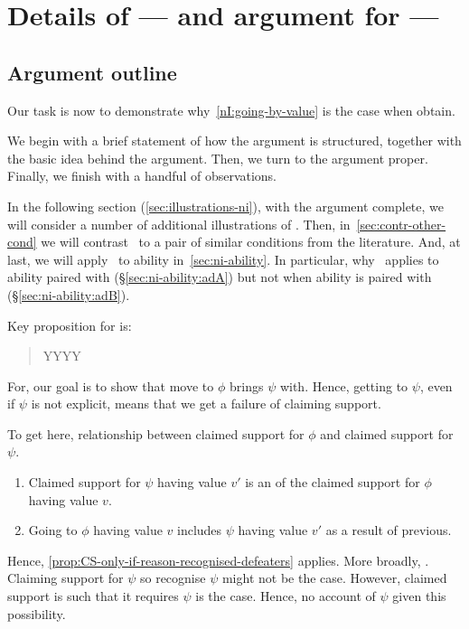 \newpage

\section{Details of --- and argument for --- \nI{}}
\label{sec:details-ni}
\label{sec:re-do-ni}

\subsection*{Argument outline}

\begin{note}
  Our task is now to demonstrate why~\ref{nI:going-by-value} is the case when \nIBackground{} obtain.

  We begin with a brief statement of how the argument is structured, together with the basic idea behind the argument.
  Then, we turn to the argument proper.
  Finally, we finish with a handful of observations.

  In the following section (\ref{sec:illustrations-ni}), with the argument complete, we will consider a number of additional illustrations of \nI{}.
  Then, in~\ref{sec:contr-other-cond} we will contrast~\nI{} to a pair of similar conditions from the literature.
  And, at last, we will apply~\nI{} to ability in~\autoref{sec:ni-ability}.
  In particular, why~\nI{} applies to ability paired with \adA{} (\S\ref{sec:ni-ability:adA}) but not when ability is paired with \adB{} (\S\ref{sec:ni-ability:adB}).
\end{note}

\begin{note}
  Key proposition for \nI{} is:

  \begin{quote}
    \vspace{-\baselineskip}
    {\color{red} YYYY}
  \end{quote}

  For, our goal is to show that move to \(\phi\) brings \(\psi\) with.
  Hence, getting to \(\psi\), even if \(\psi\) is not explicit, means that we get a failure of claiming support.

  To get here, relationship between claimed support for \(\phi\) and claimed support for \(\psi\).

  \begin{enumerate}
  \item Claimed support for \(\psi\) having value \(v'\) is an \requ{} of the claimed support for \(\phi\) having value \(v\).
  \item Going to \(\phi\) having value \(v\) includes \(\psi\) having value \(v'\) as a result of previous.
  \end{enumerate}
  Hence, \autoref{prop:CS-only-if-reason-recognised-defeaters} applies.
  More broadly, \eiS{}.
  Claiming support for \(\psi\) so recognise \(\psi\) might not be the case.
  However, claimed support is such that it requires \(\psi\) is the case.
  Hence, no account of \(\psi\) given this possibility.
\end{note}

